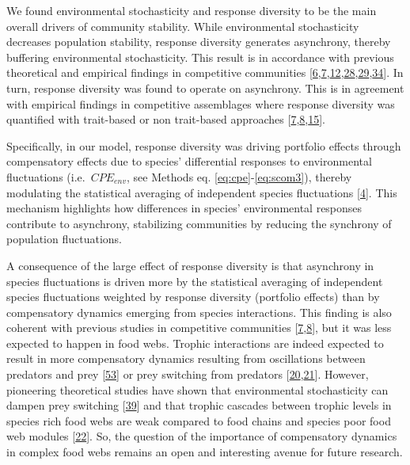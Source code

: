 \documentclass[
]{article}
\begin{document}
We found environmental stochasticity and response diversity to be the main
overall drivers of community stability. While environmental stochasticity
decreases population stability, response diversity generates asynchrony,
thereby buffering environmental stochasticity. This result is in accordance
with previous theoretical and empirical findings in competitive communities
{[}\protect\hyperlink{ref-de_mazancourt_predicting_2013}{6},\protect\hyperlink{ref-thibaut_diversity_2012}{7},\protect\hyperlink{ref-thibaut_understanding_2013}{12},\protect\hyperlink{ref-ives_stability_2000}{28},\protect\hyperlink{ref-thebault_trophic_2005}{29},\protect\hyperlink{ref-loreau_species_2008}{34}{]}. In
turn, response diversity was found to operate on asynchrony. This is in
agreement with empirical findings in competitive assemblages where response
diversity was quantified with trait-based or non trait-based approaches
{[}\protect\hyperlink{ref-thibaut_diversity_2012}{7},\protect\hyperlink{ref-zhao_biodiversity_2022}{8},\protect\hyperlink{ref-sasaki_species_2019}{15}{]}.

Specifically, in our model, response diversity was driving portfolio effects
through compensatory effects due to species' differential responses to
environmental fluctuations (i.e.~\(CPE_{env}\), see Methods eq.
\eqref{eq:cpe}-\eqref{eq:scom3}), thereby modulating the statistical averaging of
independent species fluctuations {[}\protect\hyperlink{ref-doak_statistical_1998}{4}{]}. This mechanism
highlights how differences in species' environmental responses contribute to
asynchrony, stabilizing communities by reducing the synchrony of population
fluctuations.

A consequence of the large effect of response diversity is that asynchrony in
species fluctuations is driven more by the statistical averaging of independent
species fluctuations weighted by response diversity (portfolio effects) than by
compensatory dynamics emerging from species interactions. This finding is also
coherent with previous studies in competitive communities
{[}\protect\hyperlink{ref-thibaut_diversity_2012}{7},\protect\hyperlink{ref-zhao_biodiversity_2022}{8}{]}, but it was less expected to
happen in food webs. Trophic interactions are indeed expected to result in more
compensatory dynamics resulting from oscillations between predators and prey
{[}\protect\hyperlink{ref-vandermeer_coupled_2004}{53}{]} or prey switching from predators {[}\protect\hyperlink{ref-mccann_weak_1998}{20},\protect\hyperlink{ref-mccann_diversitystability_2000}{21}{]}. However, pioneering theoretical studies have
shown that environmental stochasticity can dampen prey switching
{[}\protect\hyperlink{ref-vasseur_environmental_2007}{39}{]} and that trophic cascades between trophic levels
in species rich food webs are weak compared to food chains and species poor
food web modules {[}\protect\hyperlink{ref-fahimipour_compensation_2017}{22}{]}. So, the question of the
importance of compensatory dynamics in complex food webs remains an open and
interesting avenue for future research.
\end{document}
